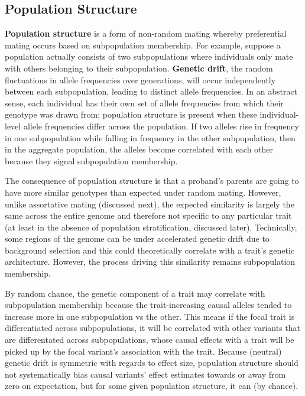 \documentclass[12pt]{article}
\begin{document}
\subsection{Population Structure}
\textbf{Population structure} is a form of non-random mating whereby preferential mating occurs based on subpopulation membership.
For example, suppose a population actually consists of two subpopulations where individuals only mate with others belonging to their subpopulation.
\textbf{Genetic drift}, the random fluctuations in allele frequencies over generations, will occur independently between each subpopulation, leading to distinct allele frequencies.
In an abstract sense, each individual has their own set of allele frequencies from which their genotype was drawn from; population structure is present when these individual-level allele frequencies differ across the population.
If two alleles rise in frequency in one subpopulation while falling in frequency in the other subpopulation, then in the aggregate population, the alleles become correlated with each other because they signal subpopulation membership.

The consequence of population structure is that a proband's parents are going to have more similar genotypes than expected under random mating.
However, unlike assortative mating (discussed next), the expected similarity is largely the same across the entire genome and therefore not specific to any particular trait (at least in the absence of population stratification, discussed later).
Technically, some regions of the genome can be under accelerated genetic drift due to background selection and this could theoretically correlate with a trait's genetic architecture.
However, the process driving this similarity remains subpopulation membership.

By random chance, the genetic component of a trait may correlate with subpopulation membership because the trait-increasing causal alleles tended to increase more in one subpopulation vs the other.
This means if the focal trait is differentiated across subpopulations, it will be correlated with other variants that are differentated across subpopulations, whose causal effects with a trait will be picked up by the focal variant's association with the trait.
Because (neutral) genetic drift is symmetric with regards to effect size, population structure should not systematically bias causal variants' effect estimates towards or away from zero on expectation, but for some given population structure, it can (by chance).
\end{document}
